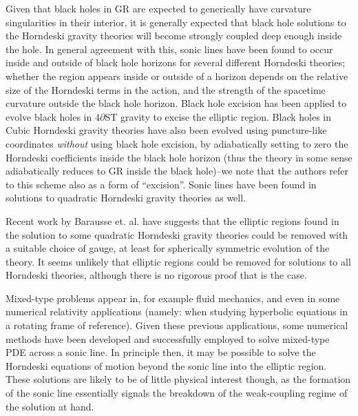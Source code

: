 \documentclass{ws-ijmpd}
\begin{document}
Given that black holes in GR are expected to generically
have curvature singularities in their interior\cite{wald2010general},
it is generally expected that black hole solutions to the Horndeski gravity
theories will become strongly coupled deep enough inside the hole. 
In general agreement with this,
sonic lines have been found to occur inside and outside
of black hole horizons for several different
Horndeski theories;
whether the region appears inside or outside of a horizon depends
on the relative size of the Horndeski terms in the action,
and the strength of the spacetime curvature outside the black hole
horizon\cite{Ripley:2019hxt,Bernard:2019fjb,Ripley:2019irj,
Ripley:2019aqj,Ripley:2020vpk,Figueras:2020dzx,East:2021bqk}.
Black hole excision has been applied to evolve black holes in
4$\partial$ST gravity\cite{East:2020hgw,East:2021bqk} to
excise the elliptic region.
Black holes in Cubic Horndeski gravity theories have also been
evolved using puncture-like coordinates \emph{without} using
black hole excision, 
by adiabatically setting to zero the Horndeski coefficients
inside the black hole horizon\cite{Figueras:2020dzx,Figueras:2021abd}
(thus the theory in some sense adiabatically reduces to GR
inside the black hole)--we note that the authors refer to this
scheme also as a form of ``excision''.
Sonic lines have been found in solutions to quadratic Horndeski
gravity theories as 
well\cite{Bernard:2019fjb,Lara:2021piy,Bezares:2020wkn}.

Recent work by Barausse et. al. have suggests that the elliptic
regions found in the solution to some quadratic Horndeski
gravity theories could be removed with a suitable choice
of gauge\cite{Bezares:2021dma}, at least for spherically
symmetric evolution of the theory.
It seems unlikely  
that elliptic regions could be removed for solutions
to all Horndeski theories,
although there is no rigorous proof that is the case.

Mixed-type problems appear in, for example fluid 
mechanics\cite{doi:10.1142/S0219891604000081,ferrari1968transonic}, 
and even in some numerical relativity
applications (namely: when studying hyperbolic
equations in a rotating frame of reference)\cite{Stewart_2001}.
Given these previous applications, some numerical methods have
been developed and successfully employed to solve mixed-type PDE
across a sonic line\cite{AZIZ197655,doi:10.1137/0718047,Stewart_2001}.
In principle then, it may be possible to solve the Horndeski
equations of motion beyond the sonic line into the elliptic region.
These solutions are likely to be of little physical interest though,
as the formation of the sonic line essentially signals the breakdown
of the weak-coupling regime of the solution at hand.
\end{document}
